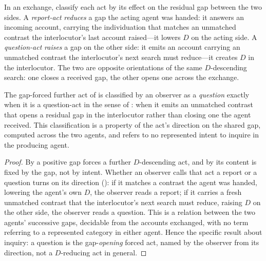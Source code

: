 \documentclass[11pt,twocolumn,a4paper]{article}
\newcommand{\dem}{D}
\begin{document}
\begin{definition}
\label{def:qdirection}
In an exchange, classify each act by its effect on the residual gap between
the two sides. A \emph{report-act} \emph{reduces} a gap the acting agent was
handed: it answers an incoming account, carrying the individuation that
matches an unmatched contrast the interlocutor's last account raised---it
lowers $\dem$ on the acting side. A \emph{question-act} \emph{raises} a gap
on the other side: it emits an account carrying an unmatched contrast the
interlocutor's next search must reduce---it creates $\dem$ in the
interlocutor. The two are opposite orientations of the same
$\dem$-descending search: one closes a received gap, the other opens one
across the exchange.
\end{definition}

\begin{theorem}
\label{thm:questionis}
The gap-forced further act of  is classified by an
observer as a \emph{question} exactly when it is a question-act in the sense
of : when it emits an unmatched contrast that opens a
residual gap in the interlocutor rather than closing one the agent received.
This classification is a property of the act's direction on the shared gap,
computed across the two agents, and refers to no represented intent to
inquire in the producing agent.
\end{theorem}

\begin{proof}
By  a positive gap forces a further $\dem$-descending
act, and by  its content is fixed by the gap, not by
intent. Whether an observer calls that act a report or a question turns on
its direction (): if it matches a contrast the agent was
handed, lowering the agent's own $\dem$, the observer reads a report; if it
carries a fresh unmatched contrast that the interlocutor's next search must
reduce, raising $\dem$ on the other side, the observer reads a question. This
is a relation between the two agents' successive gaps, decidable from the
accounts exchanged, with no term referring to a represented category in
either agent. Hence the specific result about inquiry: a question is the
gap-\emph{opening} forced act, named by the observer from its direction, not
a $\dem$-reducing act in general.
\end{proof}
\end{document}
